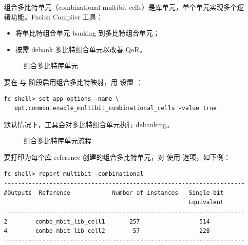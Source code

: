组合多比特单元（combinational multibit cells）是库单元，单个单元实现多个逻辑功能。Fusion Compiler 工具：
\begin{itemize}
  \item 将单比特组合单元 banking 到多比特组合单元；
  \item 按需 debank 多比特组合单元以改善 QoR。
\end{itemize}

\begin{figure}[htbp]
\centering
{}
\caption{组合多比特库单元}
\label{fig:combo-mbit-cells}
\end{figure}

要在  与  阶段启用组合多比特映射，用  设置 ：
\begin{lstlisting}
fc_shell> set_app_options -name \
   opt.common.enable_multibit_combinational_cells -value true
\end{lstlisting}

\begin{noteBox}
默认情况下，工具会对多比特组合单元执行 debanking。
\end{noteBox}

\begin{figure}[htbp]
\centering
{}
\caption{组合多比特库单元流程}
\label{fig:combo-mbit-flow}
\end{figure}

要打印为每个库 reference 创建的组合多比特单元，对  使用  选项，如下例：
\begin{lstlisting}
fc_shell> report_multibit -combinational
---------------------------------------------------------------------
#Outputs  Reference            Number of instances   Single-bit
                                                     Equivalent
---------------------------------------------------------------------
2        combo_mbit_lib_cell1       257                 514
4        combo_mbit_lib_cell2        57                 228
---------------------------------------------------------------------
\end{lstlisting}

